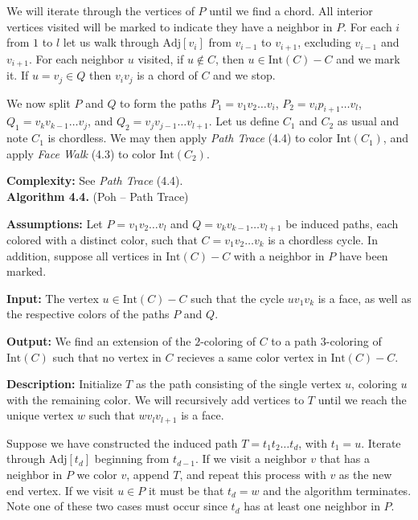 \documentclass[letterpaper, 12pt]{article}
\theoremstyle{definition}
\theoremstyle{definition}
\theoremstyle{thm}
\theoremstyle{definition}
\begin{document}
We will iterate through the vertices of $P$ until we find a chord. All interior
vertices visited will be marked to indicate they have a neighbor in $P$. For
each $i$ from $1$ to $l$ let us walk through
$\text{Adj}[v_i]$ from $v_{i-1}$ to $v_{i+1}$, excluding
$v_{i-1}$ and $v_{i+1}$. For each neighbor $u$ visited,
if $u\not\in C$, then $u\in \text{Int}(C)-C$ and we
mark it. If $u=v_j\in Q$ then $v_iv_j$ is a chord of $C$ and we stop.

We now split $P$ and $Q$ to form the paths
$P_1=v_1v_2\ldots v_i$, $P_2=v_ip_{i+1}\ldots v_l$, $Q_1=v_kv_{k-1}\ldots v_j$,
and $Q_2=v_jv_{j-1}\ldots v_{l+1}$. Let us define $C_1$ and $C_2$ as usual and
note $C_1$ is chordless.
We may then apply \textit{Path Trace} (4.4) to color $\text{Int}(C_1)$, and
apply \textit{Face Walk} (4.3) to color $\text{Int}(C_2)$.

\noindent\textbf{Complexity:} See \textit{Path Trace} (4.4).\\

\noindent\textbf{Algorithm 4.4.} (Poh -- Path Trace)

\noindent\textbf{Assumptions:} Let $P=v_1v_2\ldots v_l$ and
$Q=v_kv_{k-1}\ldots v_{l+1}$ be induced paths, each colored with a distinct
color, such that $C=v_1v_2\ldots v_k$ is a chordless cycle. In
addition, suppose all vertices in $\text{Int}(C)- C$ with a neighbor in $P$
have been marked.

\noindent\textbf{Input:} The vertex $u\in \text{Int}(C)-C$ such that the cycle
$uv_1v_k$ is a face, as well as the respective colors of the paths $P$ and $Q$.

\noindent\textbf{Output:} We find an extension of the $2$-coloring of $C$ to a
path $3$-coloring of $\text{Int}(C)$ such that no vertex in $C$ recieves a same
color vertex in $\text{Int}(C)-C$.

\noindent\textbf{Description:} Initialize $T$ as the path consisting of the
single vertex $u$, coloring $u$ with the remaining color. We will recursively
add vertices to $T$ until we reach the unique vertex $w$ such that $wv_lv_{l+1}$
is a face.

Suppose we have constructed the induced path $T=t_1t_2\ldots t_d$, with $t_1=u$.
Iterate through $\text{Adj}[t_d]$
beginning from $t_{d-1}$. If we visit a neighbor $v$ that has a neighbor in
$P$ we color $v$, append $T$, and repeat this process with $v$ as the new
end vertex. If we visit $u\in P$ it must be that $t_d=w$ and
the algorithm terminates. Note one of these two cases must occur since $t_d$
has at least one neighbor in $P$.
\end{document}
